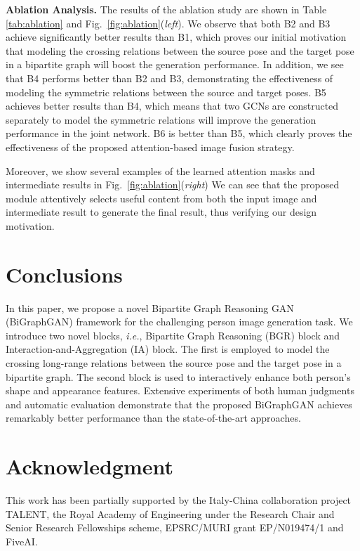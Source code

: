 \documentclass{bmvc2k}
\begin{document}
\noindent \textbf{Ablation Analysis.}
The results of the ablation study are shown in Table \ref{tab:ablation} and Fig.~\ref{fig:ablation}(\textit{left}).
We observe that both B2 and B3 achieve significantly better results than B1, which proves our initial motivation that modeling the crossing relations between the source pose and the target pose in a bipartite graph will boost the generation performance.
In addition, we see that B4 performs better than B2 and B3, demonstrating the effectiveness of modeling the symmetric relations between the source and target poses.
B5 achieves better results than B4, which means that two GCNs are constructed separately to model the symmetric relations will improve the generation performance in the joint network.
B6 is better than B5, which clearly proves the effectiveness of the proposed attention-based image fusion strategy.

Moreover, we show several examples of the learned attention masks and intermediate results in Fig.~\ref{fig:ablation}(\textit{right})
We can see that the proposed module attentively selects useful content from both the input image and intermediate result to generate the final result, thus verifying our design motivation.









%
 \section{Conclusions}
In this paper, we propose a novel Bipartite Graph Reasoning GAN (BiGraphGAN) framework for the challenging person image generation task.
We introduce two novel blocks, \emph{i.e.}, Bipartite Graph Reasoning (BGR) block and Interaction-and-Aggregation (IA) block.
The first is employed to model the crossing long-range relations between the source pose and the target pose in a bipartite graph.
The second block is used to interactively enhance both person's shape and appearance features.
Extensive experiments of both human judgments and automatic evaluation demonstrate that the proposed BiGraphGAN achieves remarkably better performance than the state-of-the-art approaches.

\section*{Acknowledgment}
This work has been partially supported by the Italy-China collaboration project TALENT, the Royal Academy of Engineering under the Research Chair and Senior Research Fellowships scheme, EPSRC/MURI grant EP/N019474/1 and FiveAI.
 
\clearpage

\end{document}
